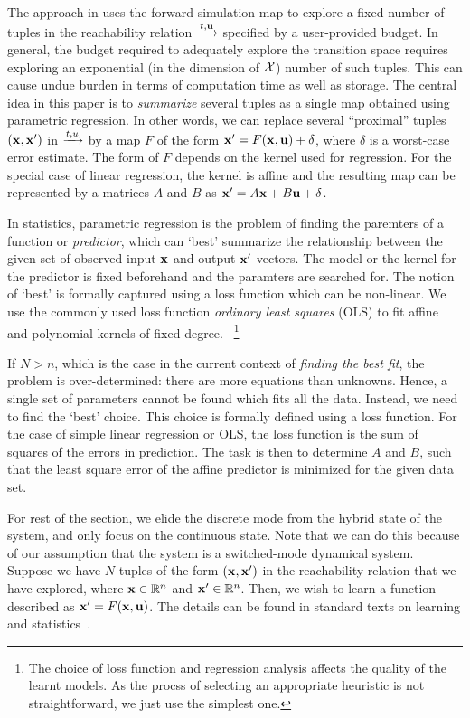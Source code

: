 The approach in \cite{zutshi2014multiple} uses the forward simulation
map to explore a fixed number of tuples in the reachability relation
$\xrightarrow{t,\mathbf{u}}$ specified by a user-provided budget.  In general, the
budget required to adequately explore the transition space requires
exploring an exponential (in the dimension of $\mathcal{X}$) number
of such tuples. This can cause undue burden in terms of computation
time as well as storage.  The central idea in this paper is to {\em
summarize} several tuples as a single map obtained using parametric
regression.  In other words, we can replace several ``proximal''
tuples $(\mathbf{x},\mathbf{x}')$ in $\xrightarrow{t,u}$ by a map $F$ of the form $\mathbf{x}' =
F(\mathbf{x}, \mathbf{u}) + \delta$, where $\delta$ is a worst-case error estimate. The
form of $F$ depends on the kernel used for regression. For the special
case of linear regression, the kernel is affine and the resulting map
can be represented by a matrices $A$ and $B$ as $\mathbf{x}' = A\mathbf{x} + B\mathbf{u} +
\delta$.

In statistics, parametric regression is the problem of finding the
paremters of a function or \textit{predictor}, which can `best'
summarize the relationship between the given set of observed input
$\mathbf{x}$ and output $\mathbf{x}'$ vectors. The model or the kernel for the
predictor is fixed beforehand and the paramters are searched for.  The
notion of `best' is formally captured using a loss function which can
be non-linear. We use the commonly used loss function \textit{ordinary
least squares} (OLS) to fit affine and polynomial kernels of fixed degree.
~\footnote{The choice of loss function and regression analysis affects the quality of
the learnt models. As the procss of selecting an appropriate heuristic
is not straightforward, we just use the simplest one.}

If $N>n$, which is the case in the current context of \textit{finding
the best fit}, the problem is over-determined: there are more
equations than unknowns. Hence, a single set of parameters cannot be
found which fits all the data. Instead, we need to find the `best'
choice. This choice is formally defined using a loss function. For the
case of simple linear regression or OLS, the loss function is the sum
of squares of the errors in prediction.  The task is then to determine
$A$ and $B$, such that the least square error of the affine predictor
is minimized for the given data set.

For rest of the section, we elide the discrete mode from the hybrid
state of the system, and only focus on the continuous state. Note that
we can do this because of our assumption that the system is a
switched-mode dynamical system.  Suppose we have $N$ tuples of the
form $(\mathbf{x},\mathbf{x}')$ in the reachability relation that we have explored,
where $\mathbf{x}\in\mathbb{R}^n$ and $\mathbf{x}'\in\mathbb{R}^n$. Then, we wish to learn a
function described as $\mathbf{x}' = F(\mathbf{x}, \mathbf{u})$.  The details can be found
in standard texts on learning and
statistics~\cite{friedman2001elements}.

